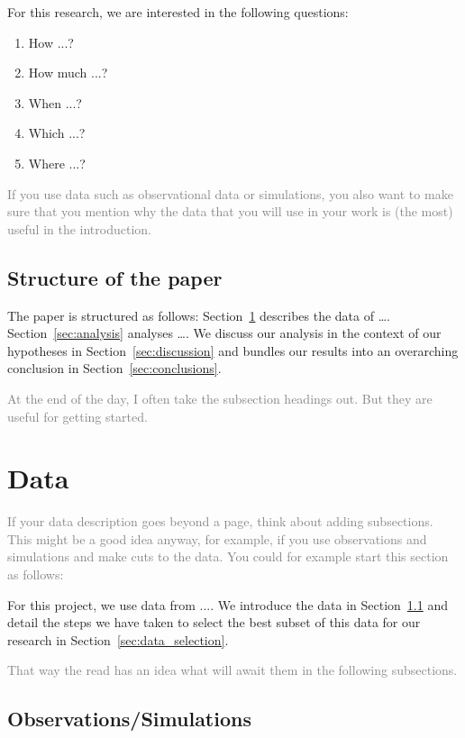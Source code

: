 \documentclass[
  journal=pasa,
  manuscript=Research-Article,
  year=2025,
  volume=X,
]{cup-journal}
\newcommand{\comment}[1]{\textcolor{gray}{#1}}
\begin{document}
For this research, we are interested in the following questions:
\begin{enumerate}
    \item How ...?
    \item How much ...?
    \item When ...?
    \item Which ...?
    \item Where ...?
\end{enumerate}

\comment{If you use data such as observational data or simulations, you also want to make sure that you mention why the data that you will use in your work is (the most) useful in the introduction.}

\subsection{Structure of the paper}

The paper is structured as follows: Section~\ref{sec:data} describes the data of \dots. Section~\ref{sec:analysis} analyses \dots. We discuss our analysis in the context of our hypotheses in Section~\ref{sec:discussion} and bundles our results into an overarching conclusion in Section~\ref{sec:conclusions}.

\comment{At the end of the day, I often take the subsection headings out. But they are useful for getting started.}


\clearpage
\section{Data} \label{sec:data}

\comment{If your data description goes beyond a page, think about adding subsections. This might be a good idea anyway, for example, if you use observations and simulations and make cuts to the data. You could for example start this section as follows:}

For this project, we use data from .... We introduce the data in Section~\ref{sec:data_observations} and detail the steps we have taken to select the best subset of this data for our research in Section~\ref{sec:data_selection}.

\comment{That way the read has an idea what will await them in the following subsections.}

\subsection{Observations/Simulations} \label{sec:data_observations}
\end{document}

